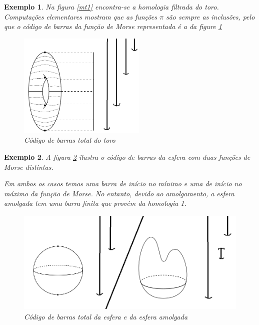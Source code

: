 \documentclass[11pt]{article}
\newtheorem{ex}{Exemplo}
\theoremstyle{nonumberplain}
\begin{document}
\begin{ex}
Na figura \ref{mt1} encontra-se a homologia filtrada do toro. Computações elementares mostram que as funções $\pi$ são sempre as inclusões, pelo que o código de barras da função de Morse representada é a da figure \ref{bctorus}
\begin{figure}[H]
\centering
\includegraphics[height=5cm]{bctorus}
\caption{Código de barras total do toro} \label{bctorus}
\end{figure}
\end{ex}

\begin{ex}
A figura \ref{bcspheres} ilustra o código de barras da esfera com duas funções de Morse distintas.

Em ambos os casos temos uma barra de início no mínimo e uma de início no máximo da função de Morse. No entanto, devido ao amolgamento, a esfera amolgada tem uma barra finita que provém da homologia 1.
\begin{figure}[H]
\centering
\includegraphics[height=5cm]{bcspheres}
\caption{Código de barras total da esfera e da esfera amolgada} \label{bcspheres}
\end{figure}
\end{ex}
\end{document}
